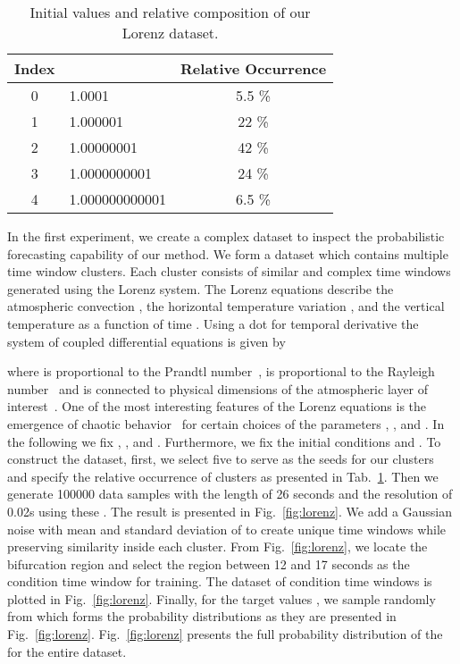\documentclass{ieeeaccess}
\begin{document}
\begin{table}
	\centering
	\caption{Initial values  and relative composition of our Lorenz dataset.}
	\renewcommand{\arraystretch}{1.5}
	\begin{tabular}{clc}
		\toprule
		\textbf{Index} &  & \textbf{Relative Occurrence} \\
		\midrule
		0 & 1.0001         & 5.5 \% \\
		1 & 1.000001       & 22 \%  \\
		2 & 1.00000001     & 42 \%  \\
		3 & 1.0000000001   & 24 \%  \\
		4 & 1.000000000001 & 6.5 \% \\
		\bottomrule
	\end{tabular}
	\label{tab:composition}
\end{table}
In the first experiment, we create a complex dataset to inspect the probabilistic forecasting capability of our method.  We form a dataset which contains multiple time window clusters. Each cluster consists of similar and complex time windows generated using the Lorenz system. The Lorenz equations describe the atmospheric convection , the horizontal temperature variation , and the vertical temperature  as a function of time . Using a dot for temporal derivative the system of coupled differential equations is given by

where  is proportional to the Prandtl number~\cite{white2006viscous},  is proportional to the Rayleigh number~\cite{chandrasekhar2013hydrodynamic} and  is connected to physical dimensions of the atmospheric layer of interest~\cite{sparrow2012lorenz}. One of the most interesting features of the Lorenz equations is the emergence of chaotic behavior~\cite{kellert1993wake,sparrow2012lorenz} for certain choices of the parameters , , and . In the following we fix , , and . Furthermore, we fix the initial conditions  and . To construct the dataset, first, we select five  to serve as the seeds for our clusters and specify the relative occurrence of clusters as presented in Tab.~\ref{tab:composition}. Then we generate 100000 data samples with the length of 26 seconds and the resolution of 0.02s using these . The result is presented in Fig.~\ref{fig:lorenz}. We add a Gaussian noise with mean  and standard deviation of  to create unique time windows while preserving similarity inside each cluster. From Fig.~\ref{fig:lorenz}, we locate the bifurcation region and select the region between 12 and 17 seconds as the condition time window for training. The dataset of condition time windows is plotted in Fig.~\ref{fig:lorenz}. Finally, for the target values , we sample randomly from  which forms the probability distributions as they are presented in Fig.~\ref{fig:lorenz}. Fig.~\ref{fig:lorenz} presents the full probability distribution of the  for the entire dataset.
\end{document}
